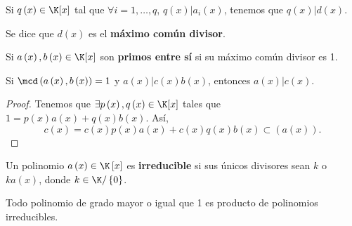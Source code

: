 Si $\displaystyle q\left(x\right) \in \K[x] $ tal que $\displaystyle \forall i = 1, \ldots, q $, $\displaystyle q\left(x\right) | a_{i}\left(x\right) $, tenemos que $\displaystyle q\left(x\right) | d\left(x\right) $. 
\begin{fdefinition}
\normalfont Se dice que $\displaystyle d\left(x\right) $ es el \textbf{máximo común divisor}.
\end{fdefinition}
\begin{fdefinition}[]
	\normalfont Si $\displaystyle a\left(x\right), b\left(x\right) \in \K[x] $ son \textbf{primos entre sí} si su máximo común divisor es 1. 
\end{fdefinition}
\begin{ftheorem}[]
\normalfont Si $\displaystyle \mcd\left(a\left(x\right), b\left(x\right)\right) = 1 $ y $\displaystyle a\left(x\right) | c\left(x\right)b\left(x\right) $, entonces $\displaystyle a\left(x\right) | c\left(x\right) $.
\end{ftheorem}
\begin{proof}
	Tenemos que $\displaystyle \exists p\left(x\right), q\left(x\right) \in \K[x] $ tales que $\displaystyle 1 = p\left(x\right)a\left(x\right) + q\left(x\right)b\left(x\right) $. Así, 
	\[c\left(x\right) = c\left(x\right)p\left(x\right)a\left(x\right) + c\left(x\right)q\left(x\right)b\left(x\right) \subset \left(a\left(x\right)\right).\]
\end{proof}
\begin{fdefinition}[]
	\normalfont Un polinomio $\displaystyle a\left(x\right) \in \K\left[x\right] $ es \textbf{irreducible} si sus únicos divisores sean $\displaystyle k $ o $\displaystyle ka\left(x\right) $, donde $\displaystyle k \in \K/ \left\{ 0\right\}  $.
\end{fdefinition}
\begin{ftheorem}[]
\normalfont Todo polinomio de grado mayor o igual que 1 es producto de polinomios irreducibles.
\end{ftheorem}
